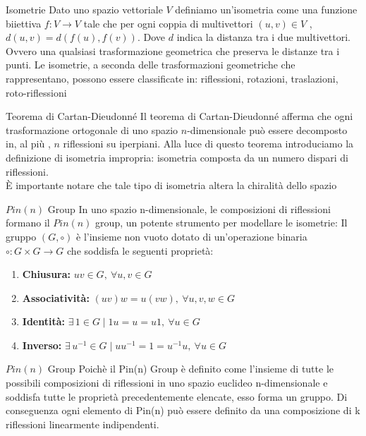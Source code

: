 \begin{frame}{Isometrie}
   Dato uno spazio vettoriale $V$ definiamo un’isometria come una funzione biiettiva $f: V\rightarrow V$ tale che per ogni coppia di multivettori $(u,v)\in V$ , $d(u,v) = d(f(u), f(v))$. Dove $d$ indica la distanza tra i due multivettori.
   \\Ovvero una qualsiasi trasformazione geometrica che preserva le distanze tra i punti.
   Le isometrie, a seconda delle trasformazioni geometriche che rappresentano, possono essere classificate in: riflessioni, rotazioni, traslazioni, roto-riflessioni
\end{frame}

\begin{frame}{Teorema di Cartan-Dieudonné}
   Il teorema di Cartan-Dieudonné afferma che ogni trasformazione ortogonale di uno spazio \(n\)-dimensionale può essere decomposto in, al più , \(n\) riflessioni su iperpiani.
   Alla luce di questo teorema introduciamo la definizione di isometria impropria: isometria composta da un numero dispari di riflessioni. 
   \\È importante notare che tale tipo di isometria altera la chiralità dello spazio
\end{frame}

\begin{frame}{\(Pin(n)\) Group}
   In uno spazio n-dimensionale, le composizioni di riflessioni formano il \(Pin(n)\) group, un potente strumento per modellare le isometrie:
   Il gruppo \((G, \circ)\) è l’insieme non vuoto dotato di un'operazione binaria \(\circ : G \times G \rightarrow G\) che soddisfa le seguenti proprietà:
   
   \begin{enumerate}
      \item \textbf{Chiusura:} \( uv \in G, \ \forall u, v \in G \)
      \item \textbf{Associatività:} \( (uv)w = u(vw), \ \forall u, v, w \in G \)
      \item \textbf{Identità:} \( \exists \, 1 \in G \mid 1u = u = u1, \ \forall u \in G \)
      \item \textbf{Inverso:} \( \exists \, u^{-1} \in G \mid uu^{-1} = 1 = u^{-1}u, \ \forall u \in G \)
    \end{enumerate}
\end{frame}

\begin{frame}{\(Pin(n)\) Group}
   Poichè il Pin(n) Group è definito come l’insieme di tutte le possibili composizioni di riflessioni in uno spazio euclideo n-dimensionale
   e soddisfa tutte le proprietà precedentemente elencate, esso forma un gruppo.
   Di conseguenza ogni elemento di Pin(n) può essere definito da una composizione di k riflessioni linearmente indipendenti.
\end{frame}

